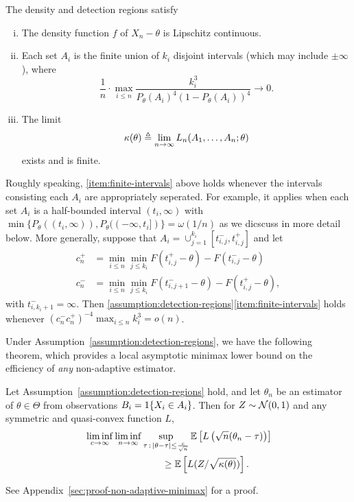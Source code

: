 \begin{assumption}
  \label{assumption:detection-regions}
  The density and detection regions satisfy
  \begin{enumerate}[(i)]
  \item \label{item:lipschitz-density}
    The density function $f$ of $X_n - \theta$ is Lipschitz continuous.
  \item \label{item:finite-intervals}
    Each set $A_i$ is the finite union of $k_i$ disjoint intervals
    (which may include $\pm \infty$), where
    \begin{equation*}
      \frac{1}{n} \cdot \max_{i \le n} \frac{k_i^3}{P_\theta(A_i)^4
        (1 - P_\theta(A_i))^4} \to 0.
    \end{equation*}
  \item \label{item:limit-variance}
    The limit
    \begin{equation}
      \label{eqn:LAN-limit}
      \kappa(\theta) \triangleq \lim_{n\to \infty} L_n(A_1,\ldots,A_n; \theta)
    \end{equation}
    exists and is finite.
  \end{enumerate}
\end{assumption}
Roughly speaking, \eqref{item:finite-intervals} above holds whenever the intervals consisting each $A_i$ are appropriately seperated. For example, it applies when each set $A_i$ is a half-bounded interval $(t_i,\infty)$ with $\min\{P_\theta((t_i,\infty)), P_\theta((-\infty,t_i])\} = \omega(1/n)$ as we dicscuss in more detail below. More generally, suppose that $A_i = \cup_{j=1}^{k_i}[t_{i,j}^-, t_{i,j}^+]$ and let 
\begin{align*}
c_n^+ & =  \min_{i \le n} \min_{j \leq k_i}  F(t^+_{i,j} - \theta) - F(t^-_{i,j}- \theta) \\
c_n^- & = \min_{i \le n} \min_{j \leq k_i}  F(t^-_{i,j+1}- \theta)  - F(t^+_{i,j}- \theta),
\end{align*}
with $t^-_{i,k_i+1} = \infty$. Then \ref{assumption:detection-regions}\eqref{item:finite-intervals} holds whenever $ (c_n^- c_n^+)^{-4} \max_{i \le n} k_i^3 = o(n)$. 

Under Assumption~\ref{assumption:detection-regions}, we have the following theorem, which provides
a local asymptotic minimax lower bound on the efficiency of
\emph{any} non-adaptive estimator.
\begin{theorem}
  \label{theorem:non-adaptive-minimax}
  Let Assumption~\ref{assumption:detection-regions} hold, and
  let ${\theta}_n$ be an estimator of $\theta \in \Theta$ from
  observations $B_i = 1\!\left\{X_i \in A_i\right\}$.
  Then for $Z \sim \mathcal{N}(0, 1)$ and any
  symmetric and quasi-convex function $L$,
  \begin{align*}
    & \liminf_{c \to \infty} \liminf_{n \to \infty}
    \sup_{\tau\,:\,|\theta-\tau| \leq \frac{c}{\sqrt{n} }}
    \mathbb{E} \left[ L\left( \sqrt{n}({\theta}_{n} - \tau) \right) \right] \\
    & \qquad \qquad \qquad \qquad \geq
    \mathbb{E}\left[ L (Z/\sqrt{\kappa(\theta)}) \right].
  \end{align*}
\end{theorem}
\noindent
See Appendix~\ref{sec:proof-non-adaptive-minimax} for a proof.

